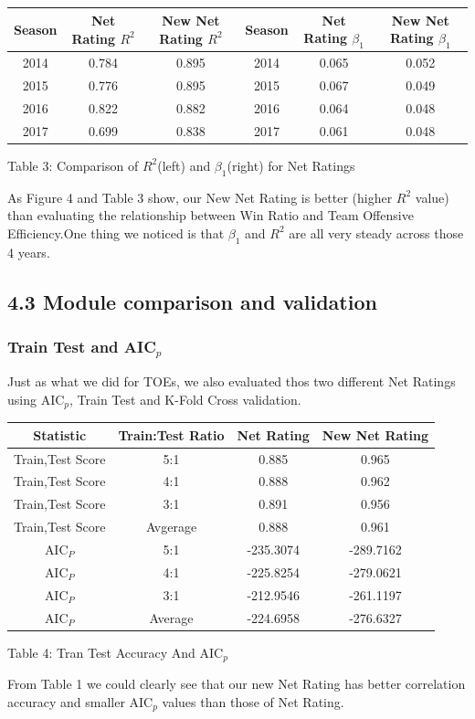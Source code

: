 \documentclass[11pt]{article}
\begin{document}
\begin{center}
\begin{tabular}{|c|c|c|c|c|c|}
\hline
Season& Net Rating $R^2$ & New Net Rating $R^2$ & Season& Net Rating $\beta_1$ & New Net Rating $\beta_1$\\
\hline
 2014& 0.784 & 0.895 &2014 & 0.065 & 0.052 \\
 2015& 0.776 & 0.895 &2015 & 0.067 & 0.049 \\ 
 2016& 0.822 & 0.882 &2016 & 0.064 & 0.048 \\
 2017& 0.699 & 0.838 &2017 & 0.061 & 0.048 \\
\hline
\end{tabular}
\bigskip

Table 3: Comparison of $R^2$(left) and $\beta_1$(right) for Net Ratings
\end{center}

As Figure 4 and Table 3 show, our New Net Rating is better (higher $R^2$ value) than evaluating the relationship between Win Ratio and Team Offensive Efficiency.One thing we noticed is that $\beta_1$ and $R^2$ are all very steady across those 4 years.

\newpage
\subsection*{4.3 Module comparison and validation}
\subsubsection*{Train Test and AIC$_p$}
Just as what we did for TOEs, we also evaluated thos two different Net Ratings using 
AIC$_p$, Train Test and K-Fold Cross validation.
\begin{center}
\begin{tabular}{|c|c|c|c|}
\hline
Statistic&Train:Test Ratio& Net Rating & New Net Rating\\
\hline
Train,Test Score & 5:1 & 0.885 & 0.965 \\
Train,Test Score & 4:1 & 0.888 & 0.962\\ 
Train,Test Score & 3:1 & 0.891 & 0.956 \\ 
\hline
Train,Test Score & Avgerage& 0.888 & 0.961\\
\hline 
AIC$_P$& 5:1 & -235.3074 & -289.7162\\
AIC$_P$& 4:1 & -225.8254 & -279.0621\\
AIC$_P$& 3:1 & -212.9546 & -261.1197 \\
\hline
AIC$_P$& Average & -224.6958 & -276.6327\\
\hline
\end{tabular}

\bigskip
Table 4: Tran Test Accuracy And AIC$_p$
\end{center}
From Table 1 we could clearly see that our new Net Rating has better correlation accuracy and smaller AIC$_p$ values than those of Net Rating.
\end{document}
